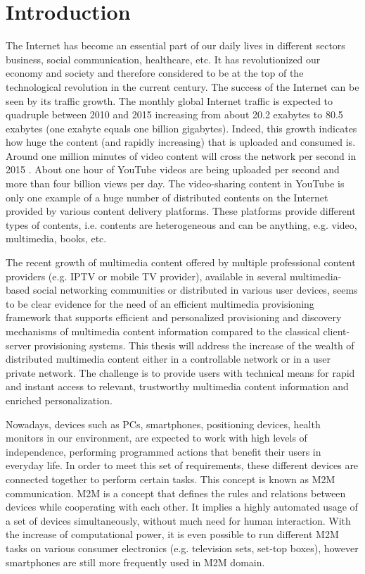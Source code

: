 \chapter{Introduction\label{cha:chapter1}}

The Internet has become an essential part of our daily lives in different sectors business, social communication, healthcare, etc. It has revolutionized our economy and society and therefore considered to be at the top of the technological revolution in the current century. The success of the Internet can be seen by its traffic growth. The monthly global Internet traffic is expected to quadruple between 2010 and 2015 increasing from about 20.2 exabytes to 80.5 exabytes (one exabyte equals one billion gigabytes)\cite{cisco1}. Indeed, this growth indicates how huge the content (and rapidly increasing) that is uploaded and consumed is. Around one million minutes of video content will cross the network per second in 2015 \cite{cisco1}. About one hour of YouTube videos are being uploaded per second and more than four billion views per day\cite{youtube1}. The video-sharing content in YouTube is only one example of a huge number of distributed contents on the Internet provided by various content delivery platforms. These platforms provide different types of contents, i.e. contents are heterogeneous and can be anything, e.g. video, multimedia, books, etc. 

The recent growth of multimedia content offered by multiple professional content providers (e.g. \ac{IPTV} or mobile TV provider), available in several multimedia-based social networking communities or distributed in various user devices, seems to be clear evidence for the need of an efficient multimedia provisioning framework that supports efficient and personalized provisioning and discovery mechanisms of multimedia content information compared to the classical client-server provisioning systems. This thesis will address the increase of the wealth of distributed multimedia content either in a controllable network or in a user private network. The challenge is to provide users with technical means for rapid and instant access to relevant, trustworthy multimedia content information and enriched personalization.

Nowadays, devices such as PCs, smartphones, positioning devices, health monitors in our environment, are expected to work with high levels of independence, performing programmed actions that benefit their users in everyday life. In order to meet this set of requirements, these different devices are connected together to perform certain tasks. This concept is known as \ac{M2M} communication. \ac{M2M} is a concept that defines the rules and relations between devices while cooperating with each other. It implies a highly automated usage of a set of devices simultaneously, without much need for human interaction. With the increase of computational power, it is even possible to run different \ac{M2M} tasks on various consumer electronics (e.g. television sets, set-top boxes), however smartphones are still more frequently used in \ac{M2M} domain.

